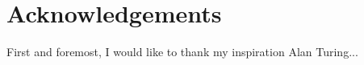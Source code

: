 \chapter*{Acknowledgements}

First and foremost, I would like to thank my inspiration Alan Turing...